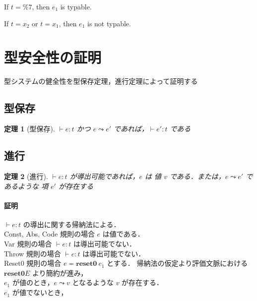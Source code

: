 \documentclass[10pt,a4j]{jarticle}
\newcommand\Resetz{\textbf{reset0}}
\newcommand\csp[1]{\texttt{\%}{#1}}
\newcommand\lto{\leadsto}
\theoremstyle{break}
\newtheorem{theo}{定理}[section]
\begin{document}
If $t=\csp{7}$, then $e_1$ is typable.

If $t=x_2$ or $t=x_1$, then $e_1$ is not typable.

\section{型安全性の証明}
型システムの健全性を型保存定理，進行定理によって証明する

\subsection{型保存}
\begin{theo}[型保存]
  $\vdash e:t$ かつ $e \lto e'$ であれば，$\vdash e':t$ である
\end{theo}

\subsection{進行}
\begin{theo}[進行]
  $\vdash e:t$ が導出可能であれば，$e$ は 値 $v$ である．または，$e \lto e'$ であるような 項 $e'$ が存在する
\end{theo}

\paragraph{証明}
$\vdash e:t$ の導出に関する帰納法による．\\
Const, Abs, Code 規則の場合 $e$ は値である．\\
Var 規則の場合 $\vdash e:t$ は導出可能でない．\\
Throw 規則の場合 $\vdash e:t$ は導出可能でない．\\
Reset0 規則の場合 $e = \Resetz~ e_1$ とする．
帰納法の仮定より評価文脈における $\Resetz E$ より簡約が進み，\\
$e_1$ が値のとき，$e \lto v$ となるような $v$ が存在する．\\
$e_1$ が値でないとき，
\end{document}
